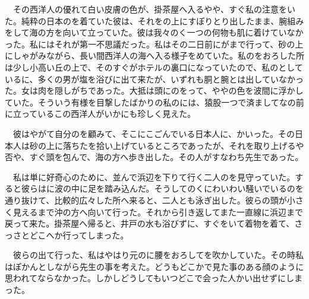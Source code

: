 \documentclass[a4j,onecolumn]{tarticle}
\begin{document}
　その西洋人の優れて白い皮膚の色が、\hbox{}掛茶屋へ入るやや、\hbox{}すぐ私の注意をいた。\hbox{}純粋の日本のを着ていた彼は、\hbox{}それをの上にすぽりとり出したまま、\hbox{}腕組みをして海の方を向いて立っていた。\hbox{}彼は我々のく一つの何物も肌に着けていなかった。\hbox{}私にはそれが第一不思議だった。\hbox{}私はその二日前にがまで行って、\hbox{}砂の上にしゃがみながら、\hbox{}長い間西洋人の海へ入る様子をめていた。\hbox{}私のをおろした所は少し小高い丘の上で、\hbox{}そのすぐがホテルの裏口になっていたので、\hbox{}私のとしているに、\hbox{}多くの男が塩を浴びに出て来たが、\hbox{}いずれも胴と腕とは出していなかった。\hbox{}女は肉を隠しがちであった。\hbox{}大抵は頭にのをって、\hbox{}ややの色を波間に浮かしていた。\hbox{}そういう有様を目撃したばかりの私のには、\hbox{}猿股一つで済ましてなの前に立っているこの西洋人がいかにも珍しく見えた。\hbox{}\par{}
　彼はやがて自分のを顧みて、\hbox{}そこにこごんでいる日本人に、\hbox{}かいった。\hbox{}その日本人は砂の上に落ちたを拾い上げているところであったが、\hbox{}それを取り上げるや否や、\hbox{}すぐ頭を包んで、\hbox{}海の方へ歩き出した。\hbox{}その人がすなわち先生であった。\hbox{}\par{}
　私は単に好奇心のために、\hbox{}並んで浜辺を下りて行く二人のを見守っていた。\hbox{}すると彼らはに波の中に足を踏み込んだ。\hbox{}そうしてのくにわいわい騒いでいるのを通り抜けて、\hbox{}比較的広々した所へ来ると、\hbox{}二人とも泳ぎ出した。\hbox{}彼らの頭が小さく見えるまで沖の方へ向いて行った。\hbox{}それから引き返してまた一直線に浜辺まで戻って来た。\hbox{}掛茶屋へ帰ると、\hbox{}井戸の水も浴びずに、\hbox{}すぐをいて着物を着て、\hbox{}さっさとどこへか行ってしまった。\hbox{}\par{}
　彼らの出て行った、\hbox{}私はやはり元のに腰をおろしてを吹かしていた。\hbox{}その時私はぽかんとしながら先生の事を考えた。\hbox{}どうもどこかで見た事のある顔のように思われてならなかった。\hbox{}しかしどうしてもいつどこで会った人かい出せずにしまった。\hbox{}\par{}
\end{document}
